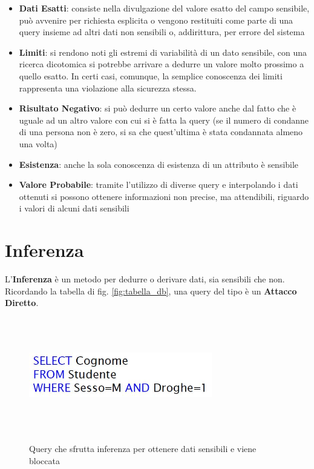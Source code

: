 \begin{itemize}

	\item\textbf{Dati Esatti}: consiste nella divulgazione del valore esatto del campo sensibile, può avvenire per richiesta esplicita o vengono restituiti come parte di una query insieme ad altri dati non sensibili o, addirittura, per errore del sistema
	\item \textbf{Limiti}: si rendono noti gli estremi di variabilità di un dato sensibile, con una ricerca dicotomica si potrebbe arrivare a dedurre un valore molto prossimo a quello esatto. In certi casi, comunque, la semplice conoscenza dei limiti rappresenta una violazione alla sicurezza stessa.
	\item \textbf{Risultato Negativo}: si può dedurre un certo valore anche dal fatto che è uguale ad un altro valore con cui si è fatta la query (se il numero di condanne di una persona non è zero, si sa che quest'ultima è stata condannata almeno una volta)
	\item \textbf{Esistenza}: anche la sola conoscenza di esistenza di un attributo è sensibile
	\item \textbf{Valore Probabile}: tramite l'utilizzo di diverse query e interpolando i dati ottenuti si possono ottenere informazioni non precise, ma attendibili, riguardo i valori di alcuni dati sensibili
\end{itemize}

\section{Inferenza}
L'\textbf{Inferenza} è un metodo per dedurre o derivare dati, sia sensibili che non. Ricordando la tabella di fig. \ref{fig:tabella_db}, una query del tipo è un \textbf{Attacco Diretto}.
\begin{figure}[htbp]


	{\includegraphics[height=5cm, width=8cm, keepaspectratio]{Immagini/Appendice1/prot_dati_04.jpg}}
				\caption{Query che sfrutta inferenza per ottenere dati sensibili e viene bloccata \label{fig:query_inferenza}}

\end{figure}

